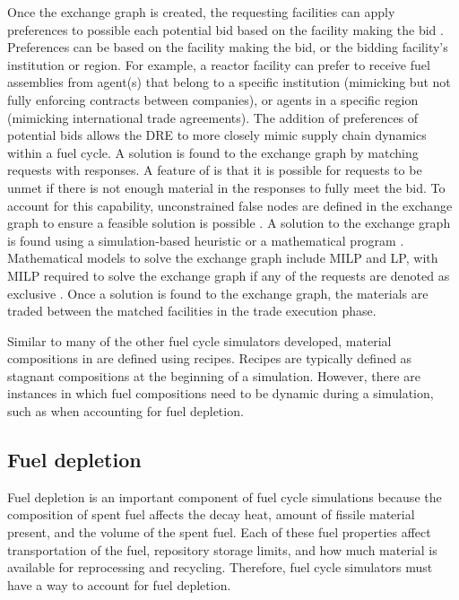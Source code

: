 Once the exchange graph is created, the requesting facilities can apply 
preferences to possible each potential bid based on the facility 
making the bid \cite{huff_fundamental_2016}. Preferences can be based on 
the facility making the bid, or the bidding facility's institution or 
region. For example, a reactor facility can prefer to receive fuel 
assemblies from agent(s) that belong to a specific institution (mimicking but not 
fully enforcing contracts between companies), or agents in a specific region 
(mimicking international trade agreements). The addition of preferences of 
potential bids allows the \gls{DRE} to more closely mimic supply chain 
dynamics within a fuel cycle. 
A solution is found to the exchange graph by matching requests with 
responses. A feature of \Cyclus is that it is possible for 
requests to be unmet if there is not enough material in the responses 
to fully meet the bid. To account for this 
capability, unconstrained false nodes are defined in the exchange graph
to ensure a feasible solution is possible \cite{gidden_methodology_2016}.
A solution to the exchange graph is found using a simulation-based 
heuristic or a mathematical program \cite{gidden_agent-based_2015}.
Mathematical models to solve the exchange graph include \gls{MILP} and 
\gls{LP}, with \gls{MILP} required to solve the exchange graph if 
any of the requests are denoted as exclusive \cite{huff_fundamental_2016}.
Once a solution is found to the exchange graph, the materials are 
traded between the matched facilities in the trade execution phase.  

Similar to many of the other fuel cycle simulators developed, material 
compositions in \Cyclus are defined using recipes. Recipes are 
typically defined as stagnant compositions at the beginning of 
a simulation. However, there are instances in which fuel compositions 
need to be dynamic during a simulation, such as when accounting for fuel 
depletion. 

\subsection{Fuel depletion}
Fuel depletion is an important component of fuel cycle simulations 
because the composition of spent fuel affects the decay heat, 
amount of fissile material present, and the volume of the spent 
fuel. Each of these fuel properties affect transportation of the fuel, 
repository storage limits, and how much material is available for 
reprocessing and recycling. Therefore, fuel cycle simulators must 
have a way to account for fuel depletion. 

